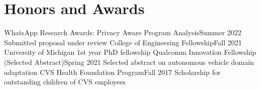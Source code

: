 \section{Honors and Awards}
  \CVSubHeadingListStart
    \CVSubheading
      {WhatsApp Research Awards: Privacy Aware Program Analysis}{Summer 2022}
      {Submitted proposal under review}{}
    \CVSubheading
      {College of Engineering Fellowship}{Fall 2021}
      {University of Michigan 1st year PhD fellowship}{}
    \CVSubheading
      {Qualcomm Innovation Fellowship (Selected Abstract)}{Spring 2021}
      {Selected abstract on autonomous vehicle domain adaptation}{}
    \CVSubheading
      {CVS Health Foundation Program}{Fall 2017}
      {Scholarship for outstanding children of CVS employees}{}
  \CVSubHeadingListEnd